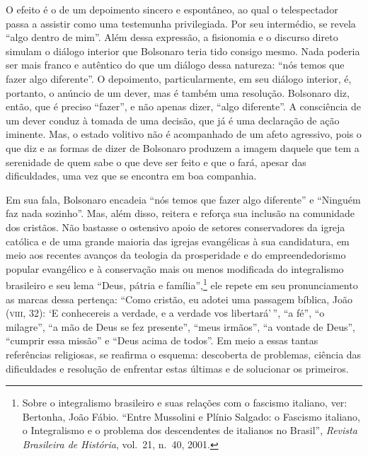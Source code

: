 O efeito é o de um depoimento sincero e espontâneo, ao qual o
telespectador passa a assistir como uma testemunha privilegiada. Por seu
intermédio, se revela ``algo dentro de mim''. Além dessa expressão, a
fisionomia e o discurso direto simulam o diálogo interior que Bolsonaro
teria tido consigo mesmo. Nada poderia ser mais franco e autêntico do
que um diálogo dessa natureza: ``nós temos que fazer algo diferente''. O
depoimento, particularmente, em seu diálogo interior, é, portanto, o
anúncio de um dever, mas é também uma resolução. Bolsonaro diz, então,
que é preciso ``fazer'', e não apenas dizer, ``algo diferente''. A
consciência de um dever conduz à tomada de uma decisão, que já é uma
declaração de ação iminente. Mas, o estado volitivo não é acompanhado de
um afeto agressivo, pois o que diz e as formas de dizer de Bolsonaro
produzem a imagem daquele que tem a serenidade de quem sabe o que deve
ser feito e que o fará, apesar das dificuldades, uma vez que se encontra
em boa companhia.

Em sua fala, Bolsonaro encadeia ``nós temos que fazer algo diferente'' e
``Ninguém faz nada sozinho''. Mas, além disso, reitera e reforça sua
inclusão na comunidade dos cristãos. Não bastasse o ostensivo apoio de
setores conservadores da igreja católica e de uma grande maioria das
igrejas evangélicas à sua candidatura, em meio aos recentes avanços da
teologia da prosperidade e do empreendedorismo popular evangélico e à
conservação mais ou menos modificada do integralismo brasileiro e seu
lema ``Deus, pátria e família'',\footnote{Sobre o integralismo brasileiro
  e suas relações com o fascismo italiano, ver: Bertonha, João Fábio.
  ``Entre Mussolini e Plínio Salgado: o Fascismo italiano, o Integralismo
  e o problema dos descendentes de italianos no Brasil'',
  \emph{Revista Brasileira de História}, vol.~21, n.~40, 2001.}
ele repete em seu pronunciamento as marcas dessa pertença: ``Como
cristão, eu adotei uma passagem bíblica, João (\textsc{viii}, 32): `E conhecereis
a verdade, e a verdade vos libertará'\,'', ``a fé'', ``o milagre'', ``a
mão de Deus se fez presente'', ``meus irmãos'', ``a vontade de Deus'',
``cumprir essa missão'' e ``Deus acima de todos''. Em meio a essas
tantas referências religiosas, se reafirma o esquema: descoberta de
problemas, ciência das dificuldades e resolução de enfrentar estas
últimas e de solucionar os primeiros.

